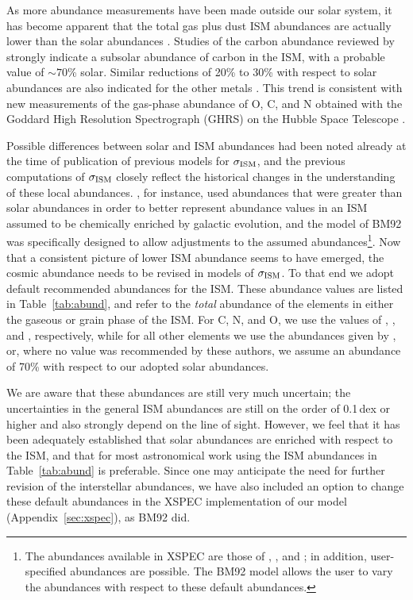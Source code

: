 \documentclass{aastex}
\newcommand{\sigism}{\ensuremath{\sigma_{\rm ISM}}}
\begin{document}
As more abundance measurements have been made outside our solar
system, it has become apparent that the total gas plus dust ISM
abundances are actually lower than the solar abundances \citep[and
references therein]{sofia:94a,savage:96b}.  Studies of the carbon
abundance reviewed by \citet{snow:95a} strongly indicate a subsolar
abundance of carbon in the ISM, with a probable value of $\sim 70$\%
solar. Similar reductions of 20\% to 30\% with respect to solar
abundances are also indicated for the other metals
\citep{snow:96a,savage:96b}. This trend is consistent with new
measurements of the gas-phase abundance of O, C, and N obtained with
the Goddard High Resolution Spectrograph (GHRS) on the Hubble Space
Telescope \citep{meyer:98a,meyer:97a,cardelli:96a}.

Possible differences between solar and ISM abundances had been noted
already at the time of publication of previous models for $\sigism$,
and the previous computations of $\sigism$ closely reflect the
historical changes in the understanding of these local abundances.
\citet{ride:77a}, for instance, used abundances that were greater than
solar abundances in order to better represent abundance values in an
ISM assumed to be chemically enriched by galactic evolution, and the
model of BM92 was specifically designed to allow adjustments to the
assumed abundances\footnote{The abundances available in XSPEC are
  those of \citet{anders:89a}, \citet{feldman:92a}, and
  \cite{anders:82a}; in addition, user-specified abundances are
  possible. The BM92 model allows the user to vary the abundances with
  respect to these default abundances.}.  Now that a consistent
picture of lower ISM abundance seems to have emerged, the cosmic
abundance needs to be revised in models of $\sigism$.  To that end we
adopt default recommended abundances for the ISM.  These abundance
values are listed in Table~\ref{tab:abund}, and refer to the
\emph{total} abundance of the elements in either the gaseous or grain
phase of the ISM. For C, N, and O, we use the values of
\citet{cardelli:96a}, \citet{meyer:97a}, and \citet{meyer:98a},
respectively, while for all other elements we use the abundances given
by \citet[Mg, Si, S, Ca, Ti, Cr, Fe, Ni]{snow:96a}, or, where no value
was recommended by these authors, we assume an abundance of 70\% with
respect to our adopted solar abundances.



We are aware that these abundances are still very much uncertain; the
uncertainties in the general ISM abundances are still on the order of
0.1\,dex or higher and also strongly depend on the line of sight.
However, we feel that it has been adequately established that solar
abundances are enriched with respect to the ISM, and that for most
astronomical work using the ISM abundances in Table~\ref{tab:abund} is
preferable. Since one may anticipate the need for further revision of
the interstellar abundances, we have also included an option to change
these default abundances in the XSPEC implementation of our model
(Appendix~\ref{sec:xspec}), as BM92 did. 
\end{document}
